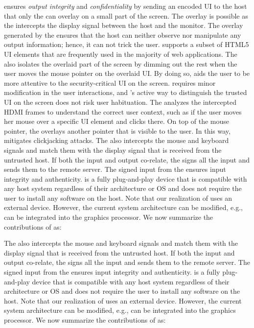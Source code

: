 \name ensures \emph{output integrity} and \emph{confidentiality} by sending an encoded UI to the host that only the \device can overlay on a small part of the screen. The overlay is possible as the \device intercepts the display signal between the host and the monitor. The overlay generated by the \device ensures that the host can neither observe nor manipulate any output information; hence, it can not trick the user. \device supports a subset of HTML5 UI elements that are frequently used in the
majority of web applications. The \device also isolates the overlaid part of the screen by dimming out the rest when the user moves the mouse pointer on the overlaid UI. By doing so, \name aids the user to be more attentive to the security-critical UI on the screen. \name requires minor modification in the user interactions, and \name's active way to distinguish the trusted UI on the screen does not risk user habituation. The \device analyzes the intercepted HDMI frames to understand the correct user context, such as if the user moves her mouse over a specific UI element and clicks there. On top of the mouse pointer, the \device overlays another pointer that is visible to the user. In this way, \name mitigates clickjacking attacks. The \device also intercepts the mouse and keyboard signals and match them with the display signal that is received from the untrusted host. If both the input and output co-relate, the \device signs all the input and sends them to the remote server. The signed input from the \device ensures input integrity and authenticity. \device is a fully plug-and-play device that is compatible with any host system regardless of their architecture or OS and does not require the user to install any software on the host. Note that our realization of \name uses an external device. However, the current system architecture can be modified, e.g., \device can be integrated into the graphics processor. We now summarize the contributions of \name as:

The \device also intercepts the mouse and keyboard signals and match them with the display signal that is received from the untrusted host. If both the input and output co-relate, the \device signs all the input and sends them to the remote server. The signed input from the \device ensures input integrity and authenticity. \device is a fully plug-and-play device that is compatible with any host system regardless of their architecture or OS and does not require the user to install any software on the host. Note that our realization of \name uses an external device. However, the current system architecture can be modified, e.g., \device can be integrated into the graphics processor. We now summarize the contributions of \name as:

